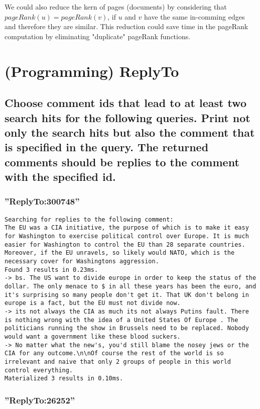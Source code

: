\documentclass{scrartcl}
\begin{document}
We could also reduce the kern of pages (documents) by considering that $pageRank(u)= pageRank(v)$, if $u$ and $v$ have the same in-comming edges and therefore they are similar. This reduction could save time in the pageRank computation by eliminating "duplicate" pageRank functions.

\section{(Programming) ReplyTo}

\subsection{Choose comment ids that lead to at least two search hits for the following queries. Print not only the search hits but also the comment that is specified in the query. The returned comments should be replies to the comment with the specified id.}

\subsubsection{”ReplyTo:300748”}

\begin{lstlisting}
Searching for replies to the following comment:
The EU was a CIA initiative, the purpose of which is to make it easy for Washington to exercise political control over Europe. It is much easier for Washington to control the EU than 28 separate countries.  Moreover, if the EU unravels, so likely would NATO, which is the necessary cover for Washingtons aggression.
Found 3 results in 0.23ms.
-> bs. The US want to divide europe in order to keep the status of the dollar. The only menace to $ in all these years has been the euro, and it's surprising so many people don't get it. That UK don't belong in europe is a fact, but the EU must not divide now.
-> its not always the CIA as much its not always Putins fault. There is nothing wrong with the idea of a United States Of Europe . The politicians running the show in Brussels need to be replaced. Nobody would want a government like these blood suckers.
-> No matter what the new's, you'd still blame the nosey jews or the CIA for any outcome.\n\nOf course the rest of the world is so irrelevant and naive that only 2 groups of people in this world control everything.
Materialized 3 results in 0.10ms.
\end{lstlisting}

\subsubsection{”ReplyTo:26252”}
\end{document}
